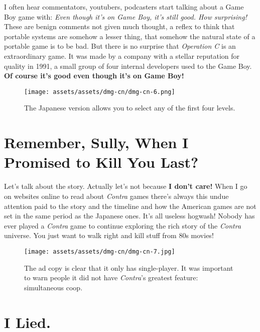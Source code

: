 \documentclass{book}
\begin{document}
I often hear commentators, youtubers, podcasters start talking about a Game Boy game with: \emph{Even though it’s on Game Boy, it’s still good. How surprising!} These are benign comments not given much thought, a reflex to think that portable systems are somehow a lesser thing, that somehow the natural state of a portable game is to be bad. But there is no surprise that \emph{Operation C} is an extraordinary game. It was made by a company with a stellar reputation for quality in 1991, a small group of four internal developers used to the Game Boy. \textbf{Of course it’s good even though it’s on Game Boy!}

\begin{figure}[hbt]
\vskip 10pt
\centering \texttt{[image: assets/assets/dmg-cn/dmg-cn-6.png]}\par\pagetwodescription The Japanese version allows you to select any of the first four levels.
\vskip 6pt
\end{figure}

\FloatBarrier\needspace{10mm}\section*{Remember, Sully, When I Promised to Kill You Last?}\nopagebreak[4]

Let’s talk about the story. Actually let’s not because \textbf{I don’t care!} When I go on websites online to read about \emph{Contra} games there’s always this undue attention paid to the story and the timeline and how the American games are not set in the same period as the Japanese ones. It’s all useless hogwash! Nobody has ever played a \emph{Contra} game to continue exploring the rich story of the \emph{Contra} universe. You just want to walk right and kill stuff from 80s movies!

\begin{figure}[hbt]
\vskip 10pt
\centering \texttt{[image: assets/assets/dmg-cn/dmg-cn-7.jpg]}\par\pagetwodescription The ad copy is clear that it only has single-player. It was important to warn people it did not have \emph{Contra}’s greatest feature: simultaneous coop.
\vskip 6pt
\end{figure}

\FloatBarrier\needspace{10mm}\section*{I Lied.}\nopagebreak[4]
\end{document}
